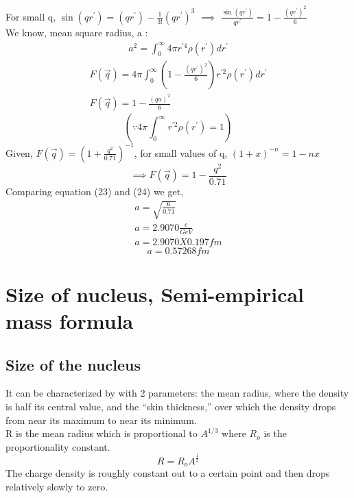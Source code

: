 \documentclass[11pt, a4paper]{article}
\begin{document}
For small q, \( \sin \left(qr^\prime\right) = \left(qr^\prime\right)-\frac{1}{3!}\left(qr^\prime\right)^3\) $\implies$ \( \frac{\sin \left(qr^\prime\right)}{qr^\prime} = 1 - \frac{\left(qr^\prime\right)^2}{6}  \)\\
We know, mean square radius, a :
\begin{gather} 
    a^2 = \int_0^{\infty} 4 \pi r^{\prime 4} \rho(r^\prime )dr^\prime 
\end{gather}
\begin{gather}
    F(\vec{q}) = 4 \pi  \int_0^{\infty} \left(1 - \frac{\left(qr^\prime\right)^2}{6}\right) r^{\prime 2}\rho(r^\prime )dr^\prime \\
    F(\vec{q}) = 1 - \frac{(qa)^2}{6} 
\end{gather}
\[
    \left(\because 4\pi \int_0^{\infty} r^{\prime 2} \rho(r^\prime ) = 1\right)
\]
Given, $F(\vec{q}) = \left(1+\frac{q^2}{0.71}\right)^{-1} $, for small values of q,  \((1+x)^{-n} = 1-nx\) 
\begin{equation}
    \implies F(\vec{q}) = 1-\frac{q^2}{0.71}
\end{equation}
Comparing equation (23) and (24) we get, 
\begin{gather}
    a = \sqrt{\frac{6}{0.71}}\\
    a = 2.9070 \frac{c}{GeV} \\
    a = 2.9070X0.197 fm 
\end{gather}
\begin{equation}
    \boxed{a = 0.57268fm }
\end{equation}
\newpage
\section{Size of nucleus, Semi-empirical mass formula}
\label{sec:1.2}
\subsection*{Size of the nucleus}
It can be characterized by with 2 parameters: the mean radius, where the density is half its central value, and the “skin thickness,” over which the density drops from near its maximum to near its minimum.\\
R is the mean radius which is proportional to $A^{1/3}$ where $R_o$ is the proportionality constant. 
\begin{equation}
    R = R_o A^{\frac{1}{3}}
\end{equation}
The charge density is roughly constant out to a certain point and then drops relatively slowly to zero.
\end{document}

